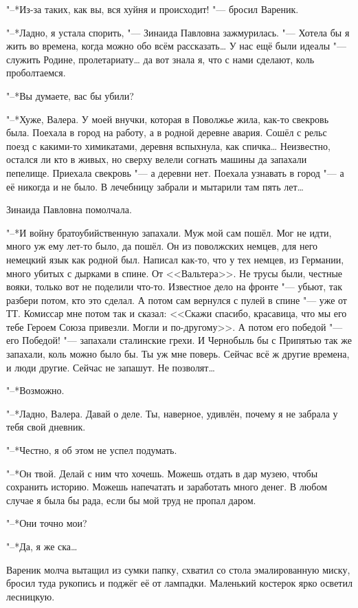 "--*Из-за таких, как вы, вся хуйня и происходит! "--- бросил Вареник.

"--*Ладно, я устала спорить, "--- Зинаида Павловна зажмурилась.
"--- Хотела бы я жить во времена, когда можно обо всём рассказать\ldots{}
У нас ещё были идеалы "--- служить Родине, пролетариату\ldots{} да вот знала я, что с нами сделают, коль проболтаемся.

"--*Вы думаете, вас бы убили?

"--*Хуже, Валера.
У моей внучки, которая в Поволжье жила, как-то свекровь была.
Поехала в город на работу, а в родной деревне авария.
Сошёл с рельс поезд с какими-то химикатами, деревня вспыхнула, как спичка\ldots{}
Неизвестно, остался ли кто в живых, но сверху велели согнать машины да запахали пепелище.
Приехала свекровь "--- а деревни нет.
Поехала узнавать в город "--- а её никогда и не было.
В лечебницу забрали и мытарили там пять лет\ldots{}

Зинаида Павловна помолчала.

"--*И войну братоубийственную запахали.
Муж мой сам пошёл.
Мог не идти, много уж ему лет-то было, да пошёл.
Он из поволжских немцев, для него немецкий язык как родной был.
Написал как-то, что у тех немцев, из Германии, много убитых с дырками в спине.
От <<Вальтера>>.
Не трусы были, честные вояки, только вот не поделили что-то.
Известное дело на фронте "--- убьют, так разбери потом, кто это сделал.
А потом сам вернулся с пулей в спине "--- уже от ТТ.
Комиссар мне потом так и сказал: <<Скажи спасибо, красавица, что мы его тебе Героем Союза привезли.
Могли и по-другому>>.
А потом его победой "--- его Победой! "--- запахали сталинские грехи.
И Чернобыль бы с Припятью так же запахали, коль можно было бы.
Ты уж мне поверь.
Сейчас всё ж другие времена, и люди другие.
Сейчас не запашут.
Не позволят\ldots{}

"--*Возможно.

"--*Ладно, Валера.
Давай о деле.
Ты, наверное, удивлён, почему я не забрала у тебя свой дневник.

"--*Честно, я об этом не успел подумать.

"--*Он твой.
Делай с ним что хочешь.
Можешь отдать в дар музею, чтобы сохранить историю.
Можешь напечатать и заработать много денег.
В любом случае я была бы рада, если бы мой труд не пропал даром.

"--*Они точно мои?

"--*Да, я же ска\ldots{}

Вареник молча вытащил из сумки папку, схватил со стола эмалированную миску, бросил туда рукопись и поджёг её от лампадки.
Маленький костерок ярко осветил лесницкую.

